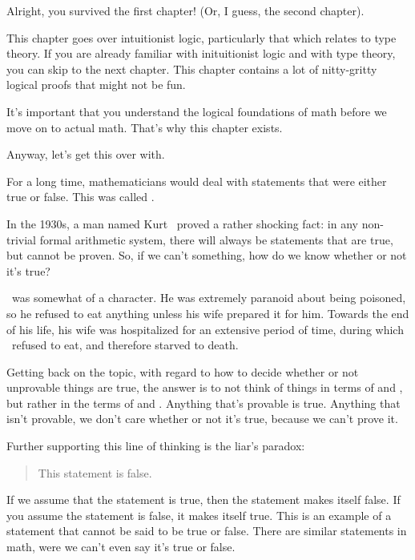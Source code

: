\label{ch:props}
\label{props}
\label{ch:logic}
\label{logic}

Alright, you survived the first chapter! (Or, I guess, the second chapter).

This chapter goes over intuitionist logic, particularly that which relates to
type theory. If you are already familiar with inituitionist logic and with type
theory, you can skip to the next chapter. This chapter contains a lot of
nitty-gritty logical proofs that might not be fun.

It's important that you understand the logical foundations of math before we
move on to actual math. That's why this chapter exists.

Anyway, let's get this over with.

For a long time, mathematicians would deal with statements that were either
true or false. This was called . 

In the 1930s, a man named Kurt \godel\ proved a rather shocking fact: in any
non-trivial formal arithmetic system, there will always be statements that are
true, but cannot be proven. So, if we can't  something, how do we
know whether or not it's true?

\godel\ was somewhat of a character. He was extremely paranoid about being
poisoned, so he refused to eat anything unless his wife prepared it for him.
Towards the end of his life, his wife was hospitalized for an extensive period
of time, during which \godel\ refused to eat, and therefore starved to
death. \cite{w-godel}

Getting back on the topic, with regard to how to decide whether or not
unprovable things are true, the answer is to not think of things in terms of
 and , but rather in the terms of  and
. Anything that's provable is true. Anything that isn't
provable, we don't care whether or not it's true, because we can't prove it.
\nocite{w-godel-incompleteness}

Further supporting this line of thinking is the liar's paradox:

\begin{quote}
    This statement is false.
\end{quote}

If we assume that the statement is true, then the statement makes itself
false. If you assume the statement is false, it makes itself true. This is an
example of a statement that cannot be said to be true or false. There are
similar statements in math, were we can't even say it's true or false.

